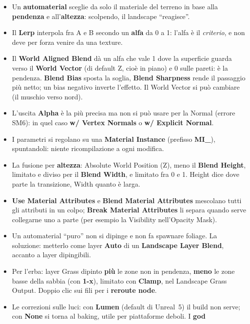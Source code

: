 \begin{itemize}
  \item Un \textbf{automaterial} sceglie da solo il materiale del terreno in base alla
        \textbf{pendenza} e all'\textbf{altezza}: scolpendo, il landscape ``reagisce''.
  \item Il \textbf{Lerp} interpola fra A e B secondo un \textbf{alfa} da 0 a 1: l'alfa è il
        \emph{criterio}, e non deve per forza venire da una texture.
  \item Il \textbf{World Aligned Blend} dà un alfa che vale 1 dove la superficie guarda verso
        il \textbf{World Vector} (di default Z, cioè in piano) e 0 sulle pareti: è la
        pendenza. \textbf{Blend Bias} sposta la soglia, \textbf{Blend Sharpness} rende il
        passaggio più netto; un bias negativo inverte l'effetto. Il World Vector si può
        cambiare (il muschio verso nord).
  \item L'uscita \textbf{Alpha} è la più precisa ma non si può usare per la Normal (errore
        SM6): in quel caso \textbf{w/ Vertex Normals} o \textbf{w/ Explicit Normal}.
  \item I parametri si regolano su una \textbf{Material Instance} (prefisso \textbf{MI\_}),
        spuntandoli: niente ricompilazione a ogni modifica.
  \item La fusione per \textbf{altezza}: Absolute World Position (Z), meno il \textbf{Blend
        Height}, limitato e diviso per il \textbf{Blend Width}, e limitato fra 0 e 1. Height
        dice dove parte la transizione, Width quanto è larga.
  \item \textbf{Use Material Attributes} e \textbf{Blend Material Attributes} mescolano tutti
        gli attributi in un colpo; \textbf{Break Material Attributes} li separa quando serve
        collegarne uno a parte (per esempio la Visibility nell'Opacity Mask).
  \item Un automaterial ``puro'' non si dipinge e non fa spawnare foliage. La soluzione:
        metterlo come layer \textbf{Auto} di un \textbf{Landscape Layer Blend}, accanto a
        layer dipingibili.
  \item Per l'erba: layer Grass dipinto \textbf{più} le zone non in pendenza, \textbf{meno}
        le zone basse della sabbia (con \textbf{1-x}), limitato con \textbf{Clamp}, nel
        Landscape Grass Output. Doppio clic sui fili per i \textbf{reroute node}.
  \item Le correzioni sulle luci: con \textbf{Lumen} (default di Unreal~5) il build non serve;
        con \textbf{None} si torna al baking, utile per piattaforme deboli. I \textbf{god
}
\end{itemize}
